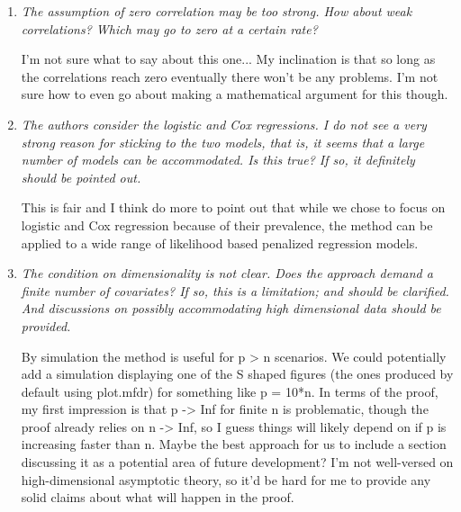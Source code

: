 \documentclass{article}
\begin{document}
\begin{enumerate}
\item {\em The assumption of zero correlation may be too strong. How about weak correlations? Which may go to zero at a certain rate?}

I'm not sure what to say about this one... My inclination is that so long as the correlations reach zero eventually there won't be any problems.  I'm not sure how to even go about making a mathematical argument for this though.

\item {\em The authors consider the logistic and Cox regressions. I do not see a very strong reason for sticking to the two models, that is, it seems that a large number of models can be accommodated. Is this true? If so, it definitely should be pointed out.}

This is fair and I think do more to point out that while we chose to focus on logistic and Cox regression because of their prevalence, the method can be applied to a wide range of likelihood based penalized regression models.

\item {\em The condition on dimensionality is not clear. Does the approach demand a finite number of covariates? If so, this is a limitation; and should be clarified. And discussions on possibly accommodating high dimensional data should be provided.}

By simulation the method is useful for p > n scenarios.  We could potentially add a simulation displaying one of the S shaped figures (the ones produced by default using plot.mfdr) for something like p = 10*n.  In terms of the proof, my first impression is that p -> Inf for finite n is problematic, though the proof already relies on n -> Inf, so I guess things will likely depend on if p is increasing faster than n.  Maybe the best approach for us to include a section discussing it as a potential area of future development? I'm not well-versed on high-dimensional asymptotic theory, so it'd be hard for me to provide any solid claims about what will happen in the proof.

\end{enumerate}

%
%
\end{document}
